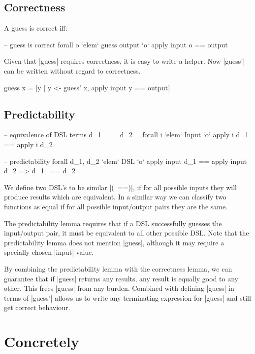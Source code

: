 \documentclass[preprint]{sigplanconf}
\begin{document}
\subsection{Correctness}

A guess is correct iff:

\begin{code}
-- guess is correct
forall o `elem` guess output `o` apply input o == output
\end{code}

Given that |guess| requires correctness, it is easy to write a helper. Now |guess'| can be written without regard to correctness.

\begin{code}
guess x = [y | y <- guess' x, apply input y == output]
\end{code}

\subsection{Predictability}

\begin{code}
-- equivalence of DSL terms
d_1 ~== d_2 = forall i `elem` Input `o` apply i d_1 == apply i d_2

-- predictability
forall d_1, d_2 `elem` DSL `o` apply input d_1 == apply input d_2 => d_1 ~== d_2
\end{code}

We define two DSL's to be similar  |(~==)|, if for all possible inputs they will produce results which are equivalent. In a similar way we can classify two functions as equal if for all possible input/output pairs they are the same.

The predictability lemma requires that if a DSL successfully guesses the input/output pair, it must be equivalent to all other possible DSL. Note that the predictability lemma does not mention |guess|, although it may require a specially chosen |input| value.

By combining the predictability lemma with the correctness lemma, we can guarantee that if |guess| returns any results, any result is equally good to any other. This frees |guess| from any burden. Combined with defining |guess| in terms of |guess'| allows us to write any terminating expression for |guess| and still get correct behaviour.

\section{Concretely}
\end{document}
